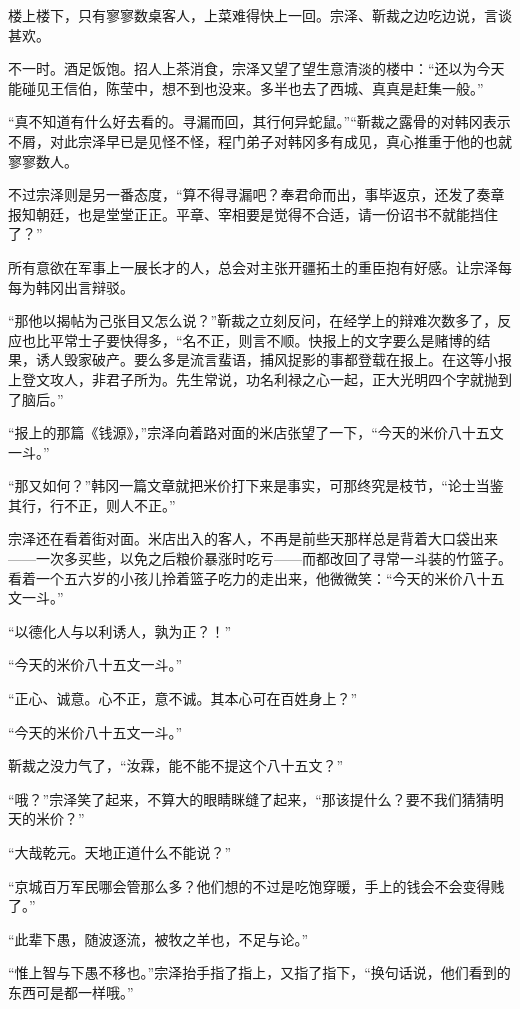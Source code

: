 楼上楼下，只有寥寥数桌客人，上菜难得快上一回。宗泽、靳裁之边吃边说，言谈甚欢。

不一时。酒足饭饱。招人上茶消食，宗泽又望了望生意清淡的楼中：“还以为今天能碰见王信伯，陈莹中，想不到也没来。多半也去了西城、真真是赶集一般。”

“真不知道有什么好去看的。寻漏而回，其行何异蛇鼠。”“靳裁之露骨的对韩冈表示不屑，对此宗泽早已是见怪不怪，程门弟子对韩冈多有成见，真心推重于他的也就寥寥数人。

不过宗泽则是另一番态度，“算不得寻漏吧？奉君命而出，事毕返京，还发了奏章报知朝廷，也是堂堂正正。平章、宰相要是觉得不合适，请一份诏书不就能挡住了？”

所有意欲在军事上一展长才的人，总会对主张开疆拓土的重臣抱有好感。让宗泽每每为韩冈出言辩驳。

“那他以揭帖为己张目又怎么说？”靳裁之立刻反问，在经学上的辩难次数多了，反应也比平常士子要快得多，“名不正，则言不顺。快报上的文字要么是赌博的结果，诱人毁家破产。要么多是流言蜚语，捕风捉影的事都登载在报上。在这等小报上登文攻人，非君子所为。先生常说，功名利禄之心一起，正大光明四个字就抛到了脑后。”

“报上的那篇《钱源》，”宗泽向着路对面的米店张望了一下，“今天的米价八十五文一斗。”

“那又如何？”韩冈一篇文章就把米价打下来是事实，可那终究是枝节，“论士当鉴其行，行不正，则人不正。”

宗泽还在看着街对面。米店出入的客人，不再是前些天那样总是背着大口袋出来——一次多买些，以免之后粮价暴涨时吃亏——而都改回了寻常一斗装的竹篮子。看着一个五六岁的小孩儿拎着篮子吃力的走出来，他微微笑：“今天的米价八十五文一斗。”

“以德化人与以利诱人，孰为正？！”

“今天的米价八十五文一斗。”

“正心、诚意。心不正，意不诚。其本心可在百姓身上？”

“今天的米价八十五文一斗。”

靳裁之没力气了，“汝霖，能不能不提这个八十五文？”

“哦？”宗泽笑了起来，不算大的眼睛眯缝了起来，“那该提什么？要不我们猜猜明天的米价？”

“大哉乾元。天地正道什么不能说？”

“京城百万军民哪会管那么多？他们想的不过是吃饱穿暖，手上的钱会不会变得贱了。”

“此辈下愚，随波逐流，被牧之羊也，不足与论。”

“惟上智与下愚不移也。”宗泽抬手指了指上，又指了指下，“换句话说，他们看到的东西可是都一样哦。”

